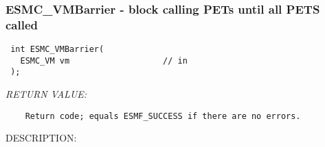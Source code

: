  
\setlength{\oldparskip}{\parskip}
\setlength{\parskip}{1.5ex}
\setlength{\oldparindent}{\parindent}
\setlength{\parindent}{0pt}
\setlength{\oldbaselineskip}{\baselineskip}
\setlength{\baselineskip}{11pt}
 
\def\bv{\begin{verbatim}}
\def\ev{\end{verbatim}}
\def\be{\begin{equation}}
\def\ee{\end{equation}}
\def\bea{\begin{eqnarray}}
\def\eea{\end{eqnarray}}
\def\bi{\begin{itemize}}
\def\ei{\end{itemize}}
\def\bn{\begin{enumerate}}
\def\en{\end{enumerate}}
\def\bd{\begin{description}}
\def\ed{\end{description}}
\def\({\left (}
\def\){\right )}
\def\[{\left [}
\def\]{\right ]}
\def\<{\left  \langle}
\def\>{\right \rangle}
\def\cI{{\cal I}}
\def\diag{\mathop{\rm diag}}
\def\tr{\mathop{\rm tr}}


 
\subsubsection [ESMC\_VMBarrier] {ESMC\_VMBarrier - block calling PETs until all PETS called}


  
\begin{verbatim} int ESMC_VMBarrier(
   ESMC_VM vm                   // in
 );\end{verbatim}{\em RETURN VALUE:}
\begin{verbatim}    Return code; equals ESMF_SUCCESS if there are no errors.\end{verbatim}
{\sf DESCRIPTION:\\ }


